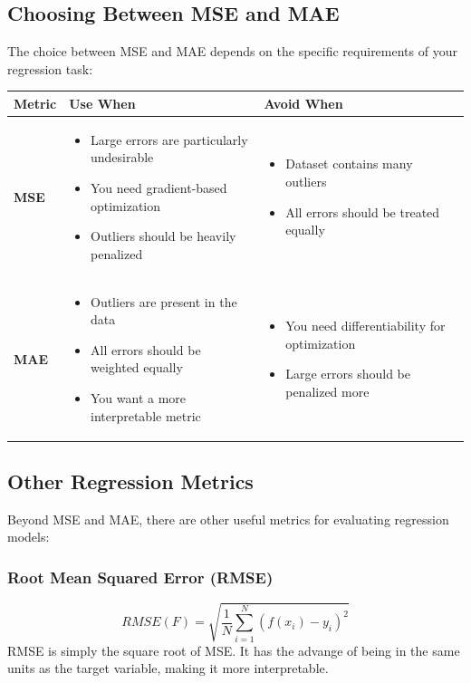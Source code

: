 \documentclass[a4paper]{article}
\theoremstyle{definition}
\begin{document}
\subsection{Choosing Between MSE and MAE}
The choice between MSE and MAE depends on the specific requirements of your regression task:
\begin{center}
    \begin{tabular}{ |l|p{5.5cm}|p{5.5cm}| }
    \hline
    \textbf{Metric} & \textbf{Use When} & \textbf{Avoid When} \\
    \hline
    \textbf{MSE} &
    \begin{itemize}[leftmargin=*, nosep]
    \item Large errors are particularly undesirable
    \item You need gradient-based optimization
    \item Outliers should be heavily penalized
    \end{itemize}
    &
    \begin{itemize}[leftmargin=*, nosep]
    \item Dataset contains many outliers
    \item All errors should be treated equally
    \end{itemize}
    \\
    \hline
    \textbf{MAE} &
    \begin{itemize}[leftmargin=*, nosep]
    \item Outliers are present in the data
    \item All errors should be weighted equally
    \item You want a more interpretable metric
    \end{itemize}
    &
    \begin{itemize}[leftmargin=*, nosep]
    \item You need differentiability for optimization
    \item Large errors should be penalized more
    \end{itemize}
    \\
    \hline
    \end{tabular}
\end{center}
\subsection{Other Regression Metrics}
Beyond MSE and MAE, there are other useful metrics for evaluating regression models:
\subsubsection{Root Mean Squared Error (RMSE)}
\[
  RMSE(F) = \sqrt{\frac{1}{N} \sum_{i = 1}^{N} (f(x_i) - y_i)^2}
\]
RMSE is simply the square root of MSE. It has the advange of being in the same units as the target 
variable, making it more interpretable.
\end{document}
